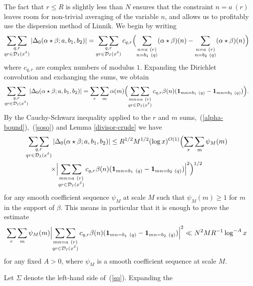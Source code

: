 \documentclass[12pt,a4paper,reqno]{amsart}
\numberwithin{equation}{section}
\theoremstyle{plain}
\theoremstyle{definition}
\newcommand{\DIone}[2]{\mathcal{D}_{{#1}}({#2})}
\newcommand\sumsum{\mathop{\sum\sum}\limits}
\newcommand{\onef}{\mathbf{1}}
\begin{document}
The fact that $r\leq R$ is slightly less than $N$ ensures that the
constraint $n = a\ (r)$ leaves room for non-trivial averaging of the
variable $n$, and allows us to profitably use the dispersion method of
Linnik.  We begin by writing
$$
\sumsum_{\substack{q,r\\qr \in
    \DIone{I}{x^\delta}}}|\Delta_0(\alpha\star\beta;a,b_1,b_2)| =
\sumsum_{\substack{q,r\\qr \in \DIone{I}{x^\delta}}} c_{q,r}
\Bigl(\sum_{\substack{n = a\ (r)\\ n= b_1\ (q)}} (\alpha \star
\beta)(n) - \sum_{\substack{n = a\ (r)\\ n = b_2\ (q)}} (\alpha
\star \beta)(n)\Bigr)
$$
where $c_{q,r}$ are complex numbers of modulus $1$.  Expanding the
Dirichlet convolution and exchanging the sums, we obtain
$$
\sumsum_{\substack{q,r\\qr \in
    \DIone{I}{x^\delta}}}|\Delta_0(\alpha\star\beta;a,b_1,b_2)| =
\sum_r \sum_m \alpha(m) \Bigl(\sumsum_{\substack{mn = a\ (r)\\qr \in
    \DIone{I}{x^\delta}}} c_{q,r} \beta(n) (\onef_{mn = b_1\ (q)} -
\onef_{mn = b_2\ (q)})\Bigr).
$$ 
By the Cauchy-Schwarz inequality applied to the $r$ and $m$
sums,~(\ref{alpha-bound}),~(\ref{soso}) and Lemma \ref{divisor-crude}
we have
\begin{multline*}
  \sumsum_{\substack{q,r\\qr \in
      \DIone{I}{x^\delta}}}|\Delta_0(\alpha\star\beta;a,b_1,b_2)| \leq
  R^{1/2}M^{1/2}(\log x)^{O(1)} \Bigl(\sum_{r}\sum_{m} \psi_M(m)\\
  \times \Bigl| \sumsum_{\substack{mn = a\ (r)\\qr \in
      \DIone{I}{x^\delta}}} c_{q,r} \beta(n) (\onef_{mn = b_1\ (q)} -
  \onef_{mn = b_2\ (q)}) \Bigr|^2\Bigr)^{1/2}
\end{multline*}
for any smooth coefficient sequence $\psi_M$ at scale $M$ such that
$\psi_M(m)\geq 1$ for $m$ in the support of $\beta$. This means in
particular that it is enough to prove the estimate
\begin{equation}\label{sq}
  \sum_r \sum_{m} \psi_M(m) \Bigl|\sumsum_{\substack{ mn = a\ (r)\\qr
      \in \DIone{I}{x^\delta}}} c_{q,r} \beta(n) (\onef_{mn = b_1\
    (q)} - \onef_{mn = b_2\ (q)})\Bigr|^2
  \ll N^2 M R^{-1} \log^{-A} x
\end{equation}
for any fixed $A>0$, where $\psi_M$ is a smooth coefficient sequence
at scale $M$.  
\par
Let $\Sigma$ denote the left-hand side of~(\ref{sq}). Expanding the
\end{document}

